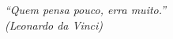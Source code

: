 \begin{epigrafe}
    \vspace*{\fill}
	\begin{flushright}
		\textit{``Quem pensa pouco, erra muito.''\\
		(Leonardo da Vinci)}
	\end{flushright}
\end{epigrafe}
